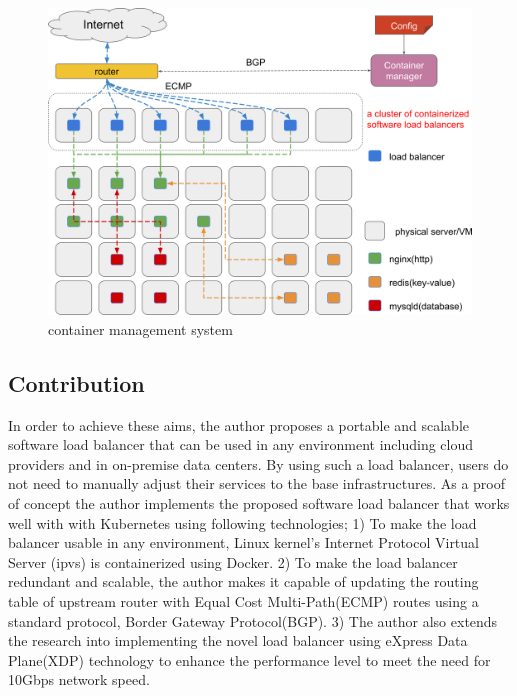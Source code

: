 \begin{figure}[h]
\begin{center}
\includegraphics[width=0.9\columnwidth]{Figs/cluster_of_container_loadbalancer}
\end{center}
\caption{
container management system
}

\label{fig:cluster_of_container_loadbalancer}
\end{figure}

\subsection{Contribution}

In order to achieve these aims, the author proposes a portable and scalable software load balancer that can be used in any environment including cloud providers and in on-premise data centers.
By using such a load balancer, users do not need to manually adjust their services to the base infrastructures.
As a proof of concept the author implements the proposed software load balancer that works well with with Kubernetes using following technologies;
1) To make the load balancer usable in any environment, Linux kernel's Internet Protocol Virtual Server (ipvs)\cite{Zhang2000} is containerized using Docker\cite{merkel2014docker}. 
2) To make the load balancer redundant and scalable, the author makes it capable of updating the routing table of upstream router with Equal Cost Multi-Path(ECMP) routes\cite{al2008scalable} using a standard protocol, Border Gateway Protocol(BGP).
3) The author also extends the research into implementing the novel load balancer using eXpress Data Plane(XDP) technology\cite{bertin2017xdp} to enhance the performance level to meet the need for 10Gbps network speed.

